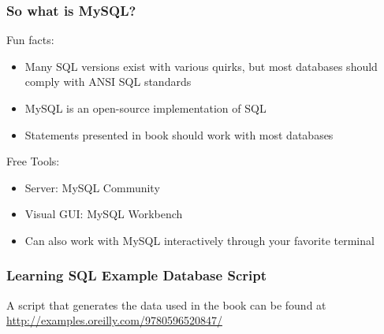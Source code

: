 \documentclass{beamer}
\begin{document}
\begin{frame}
\frametitle{So what is MySQL?}
Fun facts:
\begin{itemize}
	\item Many SQL versions exist with various quirks, but most databases should comply with ANSI SQL standards
	\item MySQL is an open-source implementation of SQL
	\item Statements presented in book should work with most databases
\end{itemize}

Free Tools:
\begin{itemize}
	\item Server: MySQL Community
	\item Visual GUI: MySQL Workbench
	\item Can also work with MySQL interactively through your favorite terminal
\end{itemize}
\end{frame}

\begin{frame}
\frametitle{Learning SQL Example Database Script}
A script that generates the data used in the book can be found at \url{http://examples.oreilly.com/9780596520847/}
\end{frame}
\end{document}
